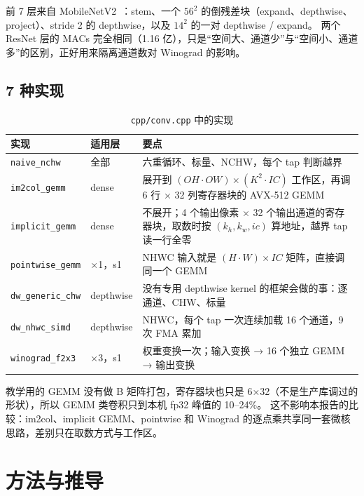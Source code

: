 \documentclass[11pt,a4paper]{ctexart}
\begin{document}
前 7 层来自 MobileNetV2~\cite{mobilenetv2}：stem、一个 $56^2$ 的倒残差块（expand、depthwise、project）、stride 2 的 depthwise，以及 $14^2$ 的一对 depthwise / expand。
两个 ResNet 层的 MACs 完全相同（1.16 亿），只是“空间大、通道少”与“空间小、通道多”的区别，正好用来隔离通道数对 Winograd 的影响。

\subsection{7 种实现}

\begin{table}[H]
\centering\small
\caption{\texttt{cpp/conv.cpp} 中的实现}\label{tab:impls}
\begin{tabularx}{\linewidth}{>{\raggedright\arraybackslash}p{3.0cm} >{\raggedright\arraybackslash}p{1.6cm} >{\raggedright\arraybackslash}X}
\toprule
实现 & 适用层 & 要点 \\
\midrule
\texttt{naive\_nchw} & 全部 & 六重循环、标量、NCHW，每个 tap 判断越界 \\
\texttt{im2col\_gemm} & dense & 展开到 $(OH\cdot OW)\times(K^2\cdot IC)$ 工作区，再调 6 行 × 32 列寄存器块的 AVX-512 GEMM \\
\texttt{implicit\_gemm} & dense & 不展开；4 个输出像素 × 32 个输出通道的寄存器块，取数时按 $(k_h,k_w,ic)$ 算地址，越界 tap 读一行全零 \\
\texttt{pointwise\_gemm} & 1×1，s1 & NHWC 输入就是 $(H\cdot W)\times IC$ 矩阵，直接调同一个 GEMM \\
\texttt{dw\_generic\_chw} & depthwise & 没有专用 depthwise kernel 的框架会做的事：逐通道、CHW、标量 \\
\texttt{dw\_nhwc\_simd} & depthwise & NHWC，每个 tap 一次连续加载 16 个通道，9 次 FMA 累加 \\
\texttt{winograd\_f2x3} & 3×3，s1 & 权重变换一次；输入变换 → 16 个独立 GEMM → 输出变换 \\
\bottomrule
\end{tabularx}
\end{table}

教学用的 GEMM 没有做 B 矩阵打包，寄存器块也只是 6×32（不是生产库调过的形状），所以 GEMM 类卷积只到本机 fp32 峰值的 10--24\%。
这不影响本报告的比较：im2col、implicit GEMM、pointwise 和 Winograd 的逐点乘共享同一套微核思路，差别只在取数方式与工作区。

\section{方法与推导}\label{sec:method}
\end{document}
